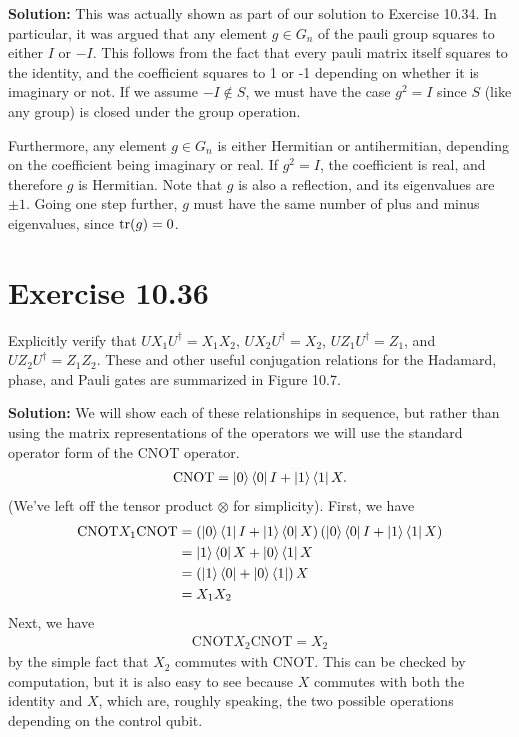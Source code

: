 \documentclass{book}
\begin{document}
    \textbf{Solution:} This was actually shown as part of our solution to Exercise 10.34. In particular, it was argued that any element $g \in G_n$ of the pauli group squares to either $I$ or $-I$. This follows from the fact that every pauli matrix itself squares to the identity, and the coefficient squares to 1 or -1 depending on whether it is imaginary or not. If we assume $-I\notin S$, we must have the case $g^2 = I$ since $S$ (like any group) is closed under the group operation. 
    
    Furthermore, any element $g\in G_n$ is either Hermitian or antihermitian, depending on the coefficient being imaginary or real. If $g^2 = I$, the coefficient is real, and therefore $g$ is Hermitian. Note that $g$ is also a reflection, and its eigenvalues are $\pm 1$. Going one step further, $g$ must have the same number of plus and minus eigenvalues, since $\tr(g) = 0$.
    
\section*{Exercise 10.36}
    Explicitly verify that $U X_1 U^\dagger= X_1 X_2$, $U X_2 U^\dagger = X_2$, $U Z_1 U^\dagger = Z_1$, and $U Z_2 U^\dagger = Z_1 Z_2$. These and other useful conjugation relations for the Hadamard, phase, and Pauli gates are summarized in Figure 10.7.
    
    \textbf{Solution:} We will show each of these relationships in sequence, but rather than using the matrix representations of the operators we will use the standard operator form of the CNOT operator.
    \begin{align}
        \text{CNOT} = \ket{0}\bra{0}I + \ket{1}\bra{1}X.
    \end{align} 
    (We've left off the tensor product $\otimes$ for simplicity).  First, we have
    \begin{align}
    \begin{aligned}
        \text{CNOT}X_1 \text{CNOT} &= \left(\ket{0}\bra{1}I  + \ket{1}\bra{0}X\right)\left(\ket{0}\bra{0}I + \ket{1}\bra{1} X\right) \\
        &=\ket{1}\bra{0} X + \ket{0}\bra{1}X \\
        &=\left(\ket{1}\bra{0}+\ket{0}\bra{1}\right) X \\
        &= X_1 X_2
    \end{aligned}
    \end{align}
    Next, we have
    \begin{align}
        \text{CNOT} X_2 \text{CNOT} = X_2
    \end{align}
    by the simple fact that $X_2$ commutes with $\text{CNOT}$. This can be checked by computation, but it is also easy to see because $X$ commutes with both the identity and $X$, which are, roughly speaking, the two possible operations depending on the control qubit.
    
\end{document}
